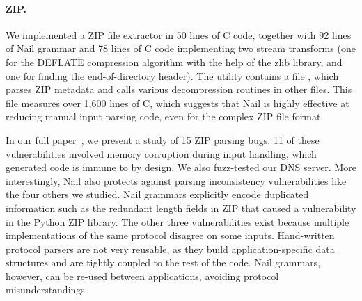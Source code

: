\paragraph{ZIP.}

We implemented a ZIP file extractor in 50 lines of C code, together with
92 lines of Nail grammar and 78 lines of C code implementing two stream
transforms (one for the DEFLATE compression algorithm with the help of
the zlib library, and one for finding the end-of-directory header).
 The  utility contains a file , which parses
ZIP metadata and calls various decompression routines in other files. This
file measures over 1,600 lines of C, which suggests that Nail is highly
effective at reducing manual input parsing code, even for the complex
ZIP file format.

In our full paper~\cite{bangert:nail}, we present a study of 15 ZIP parsing bugs.
11 of these vulnerabilities involved memory corruption during input handling, which generated code
is immune to by design. We also fuzz-tested our DNS server.
More interestingly, Nail also protects against parsing inconsistency vulnerabilities like the four others we studied.
Nail grammars explicitly encode duplicated information such as the redundant length fields in ZIP
that caused a vulnerability in the Python ZIP library. The other three vulnerabilities exist
because multiple implementations of the same protocol disagree on some inputs. Hand-written protocol
parsers are not very reusable, as they build application-specific data structures and are tightly
coupled to the rest of the code. Nail grammars, however, can be re-used between applications,
avoiding protocol misunderstandings.



